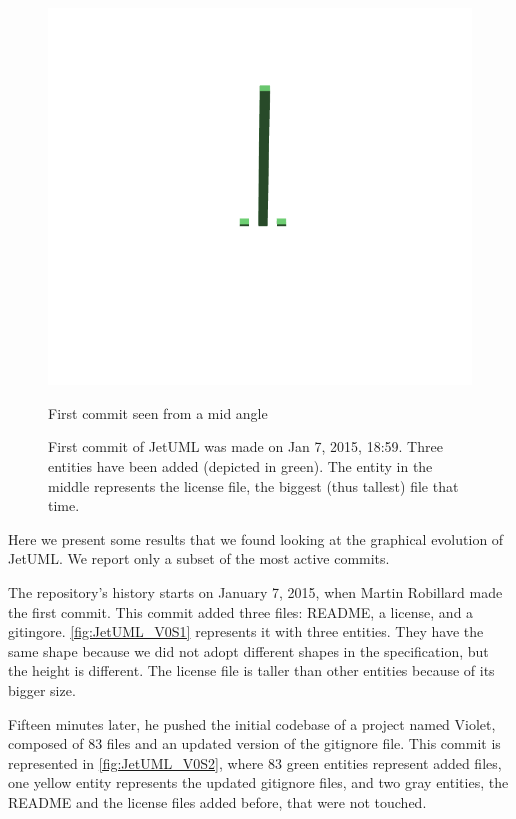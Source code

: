 \begin{figure}[ht]
    \includegraphics[width=\linewidth]{JetUML_V0S1_1.png}
    \caption{First commit seen from a mid angle} 
    \label{fig:JetUML_V0S1_1}
    \caption{First commit of JetUML was made on Jan 7, 2015, 18:59. Three entities have been added (depicted in green). The entity in the middle represents the license file, the biggest (thus tallest) file that time.} 
    \label{fig:JetUML_V0S1}
\end{figure}

Here we present some results that we found looking at the graphical evolution of JetUML. 
We report only a subset of the most active commits. 

The repository's history starts on January 7, 2015, when Martin Robillard made the first commit. 
This commit added three files: README, a license, and a gitingore. 
\autoref{fig:JetUML_V0S1} represents it with three entities. They have the same shape because we did not adopt different shapes in the specification, but the height is different. The license file is taller than other entities because of its bigger size. 

Fifteen minutes later, he pushed the initial codebase of a project named Violet, composed of 83 files and an updated version of the gitignore file. This commit is represented in \autoref{fig:JetUML_V0S2}, where 83 green entities represent added files, one yellow entity represents the updated gitignore files, and two gray entities, the README and the license files added before, that were not touched.

